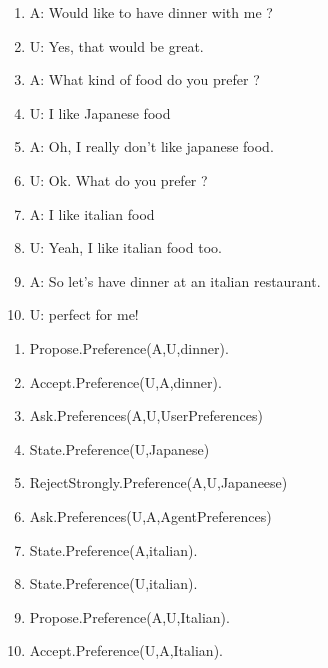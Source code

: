 \documentclass{llncs}
\begin{document}
\begin{minipage}{0.45\textwidth}
 \begin{enumerate}
	\item A: Would like to have dinner with me ?
	\item U: Yes, that would be great.
	\item A: What kind of food do you prefer ?
	\item U: I like Japanese food
	\item A: Oh, I really don't like japanese food.
	\item U: Ok. What do you prefer ?
	\item A: I like italian food
	\item U: Yeah, I like italian food too.
	\item A: So let's have dinner at an italian restaurant. 
	\item U: perfect for me!
\end{enumerate}
\end{minipage}%
\hfill
\begin{minipage}{0.45\textwidth}
 \begin{enumerate}
	\item Propose.Preference(A,U,dinner).
	\\
	\item Accept.Preference(U,A,dinner).

	\item Ask.Preferences(A,U,UserPreferences)
	\\
	\item State.Preference(U,Japanese)
	\item RejectStrongly.Preference(A,U,Japaneese)
			\\
	\item Ask.Preferences(U,A,AgentPreferences)
	\item State.Preference(A,italian).
	\item State.Preference(U,italian).
	\item Propose.Preference(A,U,Italian).
		\\
	\item Accept.Preference(U,A,Italian).
\end{enumerate}
\end{minipage}%


\noindent 
\vskip 4pt


\end{document}
